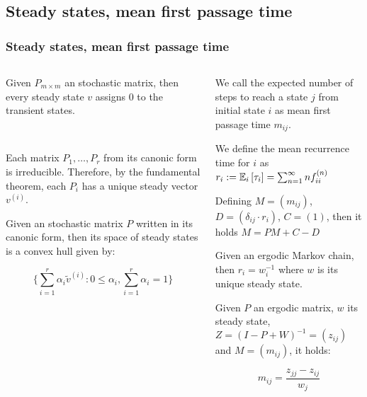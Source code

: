\subsection{Steady states, mean first passage time}
 \begin{frame}\frametitle{Steady states, mean first passage time}
    \vspace{2em}
    \begin{columns}
     \begin{column}{0.5\textwidth}
        \begin{proposition}
        Given \(P_{m\times m}\) an stochastic matrix, then every steady state \(v\) 
        assigns \(0\) to the transient states.
        
        ~\\
        \label{prop:ss-transient-zero}
        \end{proposition}
        Each matrix \(P_1, \ldots, P_r\) from its canonic form is irreducible. 
        Therefore, by the fundamental theorem, each \(P_i\) has a unique steady vector 
        \(v^{(i)}\). 
        
        \begin{proposition}
        Given an stochastic matrix \(P\) written in its canonic form, then its space of 
        steady states is a convex hull given by:

        \[
        \bigg\{\sum_{i = 1}^r \alpha_i \widetilde{v}^{(i)}: 0 \le \alpha_i, \sum_{i = 1}^{r} \alpha_i = 1\bigg\}
        \]
        \end{proposition}
    \end{column}
    \begin{column}{0.5\textwidth}
        \begin{definition}
        We call the expected number of steps to reach a state \(j\) from initial state 
        \(i\) as mean first passage time \(m_{ij}\).
        
        We define the mean recurrence time for \(i\) as
        \(r_{i} := \mathbb{E}_i\left[{\tau_{i}}\right] = \sum_{n = 1}^{\infty} n f_{ii}^{(n)}\)
        \end{definition}
        
        \begin{proposition}
        Defining \(M = (m_{ij})\), \(D = (\delta_{ij} \cdot r_i)\), \(C = (1) \), then 
        it holds $M = PM + C - D$
        \end{proposition}
        
        \begin{proposition}
        Given an ergodic Markov chain, then \(r_i = w_i^{-1}\) where \(w\) is its unique steady state.
        \end{proposition}

        \begin{theorem}
        Given \(P\) an ergodic matrix, \(w\) its steady state, \(Z = (I - P + W)^{-1} = (z_{ij})\) and \(M = (m_{ij})\), it holds:

        \[ m_{ij} = \frac{z_{jj} - z_{ij}}{w_j} \]
        \end{theorem}
    \end{column}
    \end{columns}
\end{frame}
